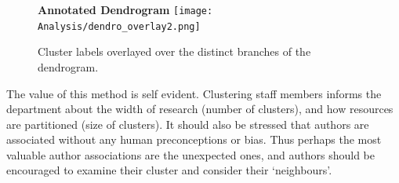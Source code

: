 \begin{center}
\begin{figure}[H]
  \centering
  \textbf{Annotated Dendrogram}
    \texttt{[image: Analysis/dendro\_overlay2.png]}
    \caption[Dendrogram annotated with labelled fields]{Cluster labels overlayed over the distinct branches of the dendrogram.}
    \label{fig:LABELLEDDENDRO}
\end{figure} 
\end{center}
The value of this method is self evident. Clustering staff members informs the department about the width of research (number of clusters), and how resources are partitioned (size of clusters). It should also be stressed that authors are associated without any human preconceptions or bias. Thus perhaps the most valuable author associations are the unexpected ones, and authors should be encouraged to examine their cluster and consider their `neighbours'.
